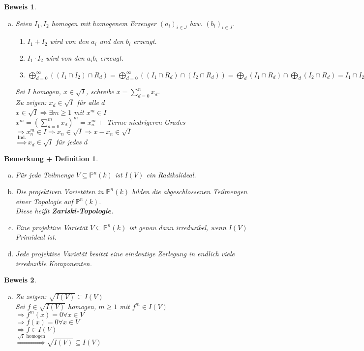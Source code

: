 \documentclass[a4paper,12pt]{report}
\theoremstyle{break}
\newtheorem{BemDef}[Def]{Bemerkung + Definition}
\theoremstyle{nonumberbreak}
\newtheorem{Bew}{Beweis}
\theoremstyle{nonumberplain}
\newcommand{\emp}[1]{\textbf{\emph{#1}}}
\newcommand{\begriff}[1]{{\index{#1}}\emp{#1}}
\newcommand{\IP}{\mathbb{P}}%
\begin{document}
\begin{Bew}
\begin{enumerate}[a)]
\item[g)]
	Seien $I_1,I_2$ homogen mit homogenem Erzeuger $(a_i)_{i\in J}$ bzw. $(b_i)_{i\in J}$.
	\begin{enumerate}[$\bullet$]
	\item
		$I_1+I_2$ wird von den $a_i$ und den $b_i$ erzeugt.
	\item
		$I_1\cdot I_2$ wird von den $a_ib_i$ erzeugt.
	\item
		$\bigoplus\limits_{d=0}^{\infty}((I_1\cap I_2)\cap R_d)=\bigoplus\limits_{d=0}^{\infty}((I_1\cap R_d)\cap (I_2\cap R_d)) = \bigoplus\limits_d(I_1\cap R_d)\cap \bigoplus\limits_d(I_2\cap R_d)=I_1\cap I_2$
	\end{enumerate}
	Sei $I$ homogen, $x\in \sqrt{I}$, schreibe $x=\sum\limits_{d=0}^n x_d$.\\
	\emph{Zu zeigen:} $x_d\in\sqrt{I}$ f\"ur alle $d$\\
	$x\in \sqrt{I} \Rightarrow \exists m\ge 1$ mit $x^m\in I$\\
	$x^m=(\sum\limits_{d=0}^m x_d)^m = x_n^m +$ Terme niedrigeren Grades\\
	$\Rightarrow x_n^m\in I\Rightarrow x_n\in \sqrt{I} \Rightarrow x-x_n\in\sqrt I$\\
	$\overset{\text{Ind.}}{\Longrightarrow}x_d\in\sqrt I$ f\"ur jedes $d$
\end{enumerate}\end{Bew}

\begin{BemDef}\label{bem10.6}\begin{enumerate}[a)]
\item
	F\"ur jede Teilmenge $V\subseteq \IP^n(k)$ ist $I(V)$ ein Radikalideal.
	
\item
	Die projektiven Variet\"aten in $\IP^n(k)$ bilden die abgeschlossenen Teilmengen einer Topologie auf $\IP^n(k)$.\\
	Diese hei\ss t \begriff{Zariski-Topologie}.

\item
	Eine projektive Variet\"at $V\subseteq\IP^n(k)$ ist genau dann irreduzibel, wenn $I(V)$ Primideal ist.

\item
	Jede projektive Variet\"at besitzt eine eindeutige Zerlegung in endlich viele irreduzible Komponenten.
\end{enumerate}\end{BemDef}

\begin{Bew}\begin{enumerate}[a)]\item
\emph{Zu zeigen:} $\sqrt{I(V)}\subseteq I(V)$\\
Sei $f\in \sqrt{I(V)}$ homogen, $m\ge 1$ mit $f^m\in I(V)$\\
$\Rightarrow f^m(x)=0\forall x\in V$\\
$\Rightarrow f(x)=0\forall x\in V$\\
$\Rightarrow f\in I(V)$\\
$\overset{\sqrt I\text{ homogen}}{\Longrightarrow} \sqrt{I(V)}\subseteq I(V)$
\end{enumerate}\end{Bew}
\end{document}

